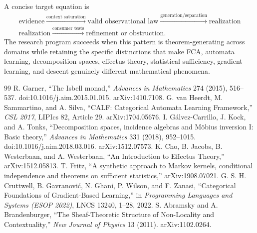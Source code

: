 \documentclass[11pt]{article}
\theoremstyle{definition}
\theoremstyle{remark}
\begin{document}
A concise target equation is
\[
\boxed{\begin{gathered}\text{evidence}\xrightarrow{\text{context saturation}}\text{valid observational law}\xrightarrow{\text{generation/separation}}\text{realization}\\\text{realization}\xrightarrow{\text{consumer tests}}\text{refinement or obstruction}.\end{gathered}}
\]
The research program succeeds when this pattern is theorem-generating across domains while retaining the specific distinctions that make FCA, automata learning, decomposition spaces, effectus theory, statistical sufficiency, gradient learning, and descent genuinely different mathematical phenomena.

\begin{thebibliography}{99}
 R. Garner, ``The Isbell monad,'' \emph{Advances in Mathematics} 274 (2015), 516--537. doi:10.1016/j.aim.2015.01.015. arXiv:1410.7108.
 G. van Heerdt, M. Sammartino, and A. Silva, ``CALF: Categorical Automata Learning Framework,'' \emph{CSL 2017}, LIPIcs 82, Article 29. arXiv:1704.05676.
 I. G\'alvez-Carrillo, J. Kock, and A. Tonks, ``Decomposition spaces, incidence algebras and M\"obius inversion I: Basic theory,'' \emph{Advances in Mathematics} 331 (2018), 952--1015. doi:10.1016/j.aim.2018.03.016. arXiv:1512.07573.
 K. Cho, B. Jacobs, B. Westerbaan, and A. Westerbaan, ``An Introduction to Effectus Theory,'' arXiv:1512.05813.
 T. Fritz, ``A synthetic approach to Markov kernels, conditional independence and theorems on sufficient statistics,'' arXiv:1908.07021.
 G. S. H. Cruttwell, B. Gavranovi\'c, N. Ghani, P. Wilson, and F. Zanasi, ``Categorical Foundations of Gradient-Based Learning,'' in \emph{Programming Languages and Systems (ESOP 2022)}, LNCS 13240, 1--28, 2022.
 S. Abramsky and A. Brandenburger, ``The Sheaf-Theoretic Structure of Non-Locality and Contextuality,'' \emph{New Journal of Physics} 13 (2011). arXiv:1102.0264.
\end{thebibliography}
\end{document}
